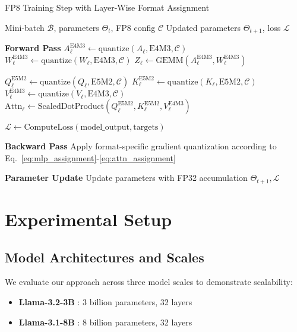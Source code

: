 \documentclass[conference]{IEEEtran}
\begin{document}
\begin{algorithm}[hbt!]
\caption{FP8 Training Step with Layer-Wise Format Assignment}
\label{alg:fp8_training}
\begin{algorithmic}
\Require Mini-batch $\mathcal{B}$, parameters $\Theta_t$, FP8 config $\mathcal{C}$
\Ensure Updated parameters $\Theta_{t+1}$, loss $\mathcal{L}$

\State \textbf{Forward Pass}
  \State $A_\ell^{\text{E4M3}} \gets \text{quantize}(A_{\ell}, \text{E4M3}, \mathcal{C})$
  \State $W_\ell^{\text{E4M3}} \gets \text{quantize}(W_{\ell}, \text{E4M3}, \mathcal{C})$
  \State $Z_\ell \gets \text{GEMM}(A_\ell^{\text{E4M3}}, W_\ell^{\text{E4M3}})$
\EndFor

  \State $Q_\ell^{\text{E5M2}} \gets \text{quantize}(Q_{\ell}, \text{E5M2}, \mathcal{C})$
  \State $K_\ell^{\text{E5M2}} \gets \text{quantize}(K_{\ell}, \text{E5M2}, \mathcal{C})$
  \State $V_\ell^{\text{E4M3}} \gets \text{quantize}(V_{\ell}, \text{E4M3}, \mathcal{C})$
  \State $\text{Attn}_\ell \gets \text{ScaledDotProduct}(Q_\ell^{\text{E5M2}}, K_\ell^{\text{E5M2}}, V_\ell^{\text{E4M3}})$
\EndFor

\State $\mathcal{L} \gets \text{ComputeLoss}(\text{model\_output}, \text{targets})$

\State \textbf{Backward Pass}
\State Apply format-specific gradient quantization according to Eq.~\ref{eq:mlp_assignment}-\ref{eq:attn_assignment}

\State \textbf{Parameter Update}
\State Update parameters with FP32 accumulation
\State \Return $\Theta_{t+1}, \mathcal{L}$
\end{algorithmic}
\end{algorithm}

\section{Experimental Setup}

\subsection{Model Architectures and Scales}

We evaluate our approach across three model scales to demonstrate scalability:

\begin{itemize}
\item \textbf{Llama-3.2-3B} \cite{meta2024llama3.2}: 3 billion parameters, 32 layers
\item \textbf{Llama-3.1-8B} \cite{meta2024llama3.1}: 8 billion parameters, 32 layers  
\end{itemize}
\end{document}
